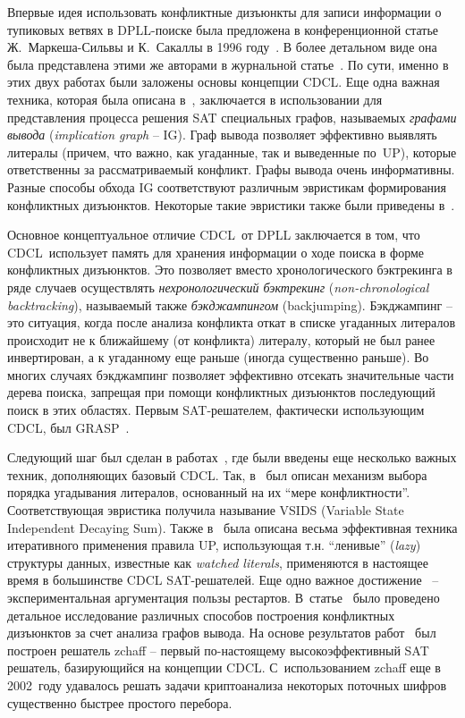 Впервые идея использовать конфликтные дизъюнкты для записи информации о тупиковых ветвях в DPLL-поиске была предложена в конференционной статье Ж.~Маркеша-Сильвы и К.~Сакаллы в 1996 году~\cite{grasp}.
В более детальном виде она была представлена этими же авторами в журнальной статье~\cite{marques-silva1999}.
По сути, именно в этих двух работах были заложены основы концепции CDCL.
Еще одна важная техника, которая была описана в~\cite{grasp,marques-silva1999}, заключается в использовании для представления процесса решения SAT специальных графов, называемых \textit{графами вывода} (\textit{implication graph} \--- IG).
Граф вывода позволяет эффективно выявлять литералы (причем, что важно, как угаданные, так и выведенные по~UP), которые ответственны за рассматриваемый конфликт.
Графы вывода очень информативны.
Разные способы обхода IG соответствуют различным эвристикам формирования конфликтных дизъюнктов. Некоторые такие эвристики также были приведены в~\cite{graps,marques-silva1999}.

Основное концептуальное отличие CDCL~от DPLL заключается в том, что CDCL~использует память для хранения информации о ходе поиска в форме конфликтных дизъюнктов.
Это позволяет вместо хронологического бэктрекинга в ряде случаев осуществлять \textit{нехронологический бэктрекинг} (\textit{non-chronological backtracking}), называемый также \textit{бэкджампингом} (backjumping).
Бэкджампинг \--- это ситуация, когда после анализа конфликта откат в списке угаданных литералов происходит не к ближайшему (от конфликта) литералу, который не был ранее инвертирован, а к угаданному еще раньше (иногда существенно раньше).
Во многих случаях бэкджампинг позволяет эффективно отсекать значительные части дерева поиска, запрещая при помощи конфликтных дизъюнктов последующий поиск в этих областях.
Первым SAT-решателем, фактически использующим CDCL, был GRASP~\cite{grasp}.

Следующий шаг был сделан в работах~\cite{moskewicz2001,zhang2001}, где были введены еще несколько важных техник, дополняющих базовый CDCL.
Так, в~\cite{moskewicz2001} был описан механизм выбора порядка угадывания литералов, основанный на их \enquote{мере конфликтности}.
Соответствующая эвристика получила называние VSIDS (Variable State Independent Decaying Sum).
Также в~\cite{moskewicz2001} была описана весьма эффективная техника итеративного применения правила UP, использующая т.н. \enquote{ленивые} (\textit{lazy}) структуры данных, известные как \textit{watched literals}, применяются в настоящее время в большинстве CDCL SAT-решателей.
Еще одно важное достижение~\cite{moskewicz2001} \--- экспериментальная аргументация пользы рестартов.
В~статье~\cite{zhang2001} было проведено детальное исследование различных способов построения конфликтных дизъюнктов за счет анализа графов вывода.
На основе результатов работ~\cite{moskewicz2001,zhang2001} был построен решатель zchaff \--- первый по-настоящему высокоэффективный SAT решатель, базирующийся на концепции CDCL.
С~использованием zchaff еще в 2002~году удавалось решать задачи криптоанализа некоторых поточных шифров существенно быстрее простого перебора.

